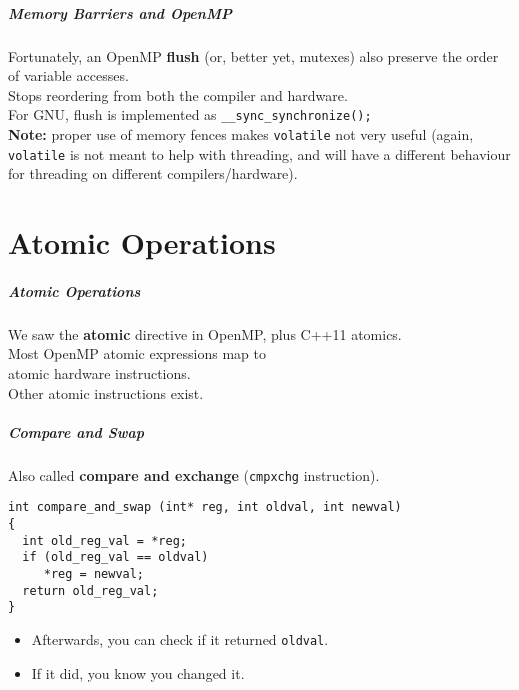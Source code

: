   
\begin{frame}
  \frametitle{Memory Barriers and OpenMP}

  
    Fortunately, an OpenMP {\bf flush} (or, better yet, mutexes) also preserve the order of variable accesses.\\[1em]
    Stops reordering from both the compiler and hardware.\\[1em]
    For GNU, flush is implemented as
      {\tt \_\_sync\_synchronize();}\\[1em]

  {\bf Note:} proper use of memory fences makes {\tt volatile} not very
  useful (again, {\tt volatile} is not meant to help with threading, and will
  have a different behaviour for threading on different compilers/hardware).
  
\end{frame}

\part{Atomic Operations}
\frame{\partpage}

\begin{frame}
  \frametitle{Atomic Operations}

  

 We saw the {\bf atomic} directive in OpenMP, plus C++11 atomics.\\[1em]

 Most OpenMP atomic expressions map to\\ atomic hardware instructions.\\[1em]

 Other atomic instructions exist.
  

\end{frame}

\begin{frame}[fragile]
  \frametitle{Compare and Swap}

  
  Also called {\bf compare and exchange} ({\tt cmpxchg} instruction).

  \begin{lstlisting}
int compare_and_swap (int* reg, int oldval, int newval) 
{
  int old_reg_val = *reg;
  if (old_reg_val == oldval) 
     *reg = newval;
  return old_reg_val;
}
  \end{lstlisting}

  \begin{itemize}
    \item Afterwards, you can check if it returned {\tt oldval}.
    \item If it did, you know you changed it.
  \end{itemize}
  
\end{frame}

